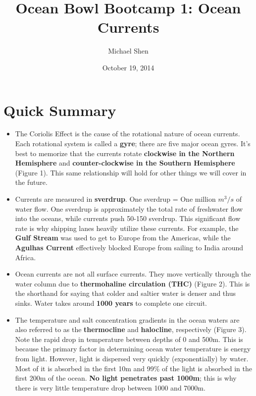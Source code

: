 \documentclass{article}
\begin{document}
\title{Ocean Bowl Bootcamp 1: Ocean Currents}
\author{Michael Shen}
\date{October 19, 2014}
\maketitle

\section{Quick Summary}
\begin{itemize}
	\item The Coriolis Effect is the cause of the rotational nature of ocean currents. Each rotational system is called a \textbf{gyre}; there are five major ocean gyres. It's best to memorize that the currents rotate \textbf{clockwise in the Northern Hemisphere} and \textbf{counter-clockwise in the Southern Hemisphere} (Figure 1). This same relationship will hold for other things we will cover in the future.
	\item Currents are measured in \textbf{sverdrup}. One sverdrup = One million $m^3/s$ of water flow. One sverdrup is approximately the total rate of freshwater flow into the oceans, while currents push 50-150 sverdrup. This significant flow rate is why shipping lanes heavily utilize these currents. For example, the \textbf{Gulf Stream} was used to get to Europe from the Americas, while the \textbf{Agulhas Current} effectively blocked Europe from sailing to India around Africa.
	\item Ocean currents are not all surface currents. They move vertically through the water column due to \textbf{thermohaline circulation (THC)} (Figure 2). This is the shorthand for saying that colder and saltier water is denser and thus sinks. Water takes around \textbf{1000 years} to complete one circuit.
	\item The temperature and salt concentration gradients in the ocean waters are also referred to as the \textbf{thermocline} and \textbf{halocline}, respectively (Figure 3). Note the rapid drop in temperature between depths of 0 and 500m. This is because the primary factor in determining ocean water temperature is energy from light. However, light is dispersed very quickly (exponentially) by water. Most of it is absorbed in the first 10m and 99\% of the light is absorbed in the first 200m of the ocean. \textbf{No light penetrates past 1000m}; this is why there is very little temperature drop between 1000 and 7000m. 
\end{itemize}
\end{document}
